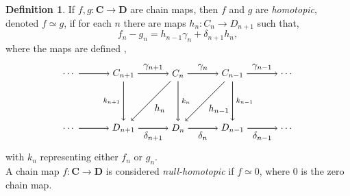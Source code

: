 \documentclass[11.5pt, twoside, a4paper, titlepage]{report}
\theoremstyle{definition}
\newtheorem{mydef}{Definition}[section]
\theoremstyle{plain}
\begin{document}
\begin{mydef}
If $f,g:\mathbf{C} \to \mathbf{D}$  are chain maps, then $f$ and $g$ are \emph{homotopic}, denoted $f\simeq g$, if for each $n$ there are maps $h_n: C_n \to D_{n+1}$ such that,
\begin{equation*}
f_n-g_n=h_{n-1}\gamma_n + \delta_{n+1}h_n,
\end{equation*}
where the maps are defined
,
\begin{equation*}
\begin{tikzpicture}[->,-latex, auto, main path/.style={->, semithick}, main node/.style={}]
\node	[main node]		(2) at (2,0)		{\dots};
\node	[main node]		(3) at (4,0)		{$C_{n+1}$};
\node [main node]		(4) at (6,0)		{$C_n$};
\node [main node]		(5) at (8,0)		{$C_{n-1}$};
\node	[main node]		(11) at (10,0)	{\dots};

\node	[main node]		(7) at (2,-2)		{\dots};
\node	[main node]		(8) at (4,-2)		{$D_{n+1}$};
\node [main node]		(9) at (6,-2)		{$D_n$};
\node [main node]		(10) at (8,-2)	{$D_{n-1}$};
\node [main node]		(13) at (10,-2)	{\dots};

\draw (2) edge [main path] node [auto] {$$} (3);
\draw (3) edge [main path] node [auto] {$\gamma_{n+1}$} (4);
\draw (4) edge [main path] node [auto] {$\gamma_n$} (5);
\draw (5) edge [main path] node [auto] {$\gamma_{n-1}$} (11);

\draw (7) edge [main path] node [auto] {$$} (8);
\path (8) edge [main path] node [auto, swap] {$\delta_{n+1}$} (9);
\draw (9) edge [main path] node [auto, swap] {$\delta_n$} (10);
\draw (10) edge [main path] node [auto, swap] {$\delta_{n-1}$} (13);

\draw (3) edge [main path] node [auto, swap] {$\scriptstyle{k_{n+1}}$} (8);
\draw (4) edge [main path] node [auto] {$\scriptstyle{k_n}$} (9);
\draw (5) edge [main path] node [auto] {$\scriptstyle{k_{n-1}}$} (10);

\draw (4) edge [main path] node [auto] {$h_n$} (8);
\draw (5) edge [main path] node [auto] {$h_{n-1}$} (9);
\end{tikzpicture}
\end{equation*}
with $k_n$ representing either $f_n$ or $g_n$.\\
A chain map $f:\mathbf{C} \to \mathbf{D}$ is considered \emph{null-homotopic} if $f \simeq 0$, where $0$ is the zero chain map.
\end{mydef}
\end{document}
